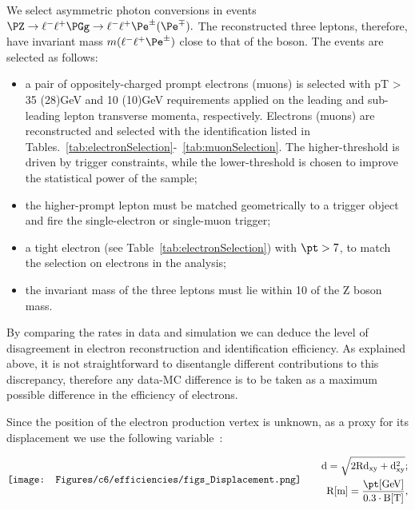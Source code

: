 We select asymmetric photon conversions in events
\(\PZ\to\ell^-\ell^+\PGg\to\ell^-\ell^+\Pe^\pm(\Pe^\mp).\)
The reconstructed three leptons,
therefore, have invariant mass
\(m(\ell^-\ell^+\Pe^\pm)\)
close to that of the \PZ boson.
The events are selected as follows:
\begin{itemize}
\setlength\itemsep{-0.2em}
\item a pair of oppositely-charged prompt electrons (muons) is selected with pT > 35 (28)GeV and
10 (10)GeV requirements applied on the leading and sub-leading lepton transverse momenta,
 respectively. Electrons (muons) are reconstructed and selected with
 the identification listed in Tables.~\ref{tab:electronSelection}-~\ref{tab:muonSelection}.
  The higher-\pt threshold is driven by trigger constraints, while the
  lower-\pt threshold is chosen to improve the statistical power of
  the sample; 
\item the higher-\pt prompt lepton must be matched geometrically to a
  trigger object and fire the single-electron or single-muon trigger;
\item a \displ tight electron (see
  Table~\ref{tab:electronSelection}) with $\pt>7$\GeV, to match the
  selection on \displ electrons in the analysis;
\item the invariant mass of the three leptons must lie within 10\GeV
  of the Z boson mass.
\end{itemize}
By comparing the rates in data and simulation we can deduce the level
of disagreement in \displ electron reconstruction and
identification efficiency.
As explained above, it is not straightforward to disentangle different
contributions to this discrepancy, therefore any data-MC difference is
to be taken as a maximum possible difference in the efficiency of
\displ electrons.

Since the position of the \displ electron production vertex is
unknown, as a proxy for its displacement we use the following
variable~\cite{convz}:

\begin{align}
\vcenter{\hbox{\texttt{[image: Figures/c6/efficiencies/figs\_Displacement.png]}}}
&\qquad
\begin{aligned}
\mathrm{d = \sqrt{2Rd_{xy}+d_{xy}^2}};
\\
\mathrm{R [m] = \frac{\pt [GeV]}{0.3 \cdot B [T]}},
\end{aligned}\\
\vcenter{\hbox{\begin{minipage}{4cm}
\end{minipage}}}
& \notag
\end{align}

